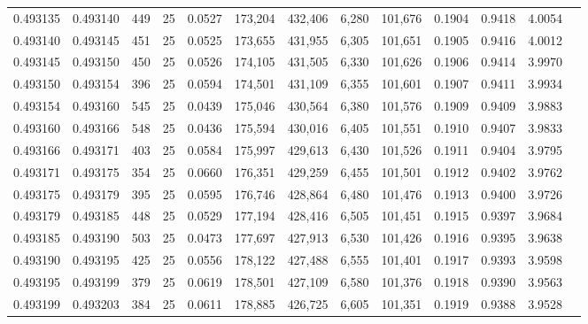 \begin{tabular}{rrrrrrrrrrrrr}
0.493135 & 0.493140 &   449 &  25 &                                     0.0527 & 173,204 & 432,406 &   6,280 & 101,676 & 0.1904 & 0.9418 & 4.0054 \\
0.493140 & 0.493145 &   451 &  25 &                                     0.0525 & 173,655 & 431,955 &   6,305 & 101,651 & 0.1905 & 0.9416 & 4.0012 \\
0.493145 & 0.493150 &   450 &  25 &                                     0.0526 & 174,105 & 431,505 &   6,330 & 101,626 & 0.1906 & 0.9414 & 3.9970 \\
0.493150 & 0.493154 &   396 &  25 &                                     0.0594 & 174,501 & 431,109 &   6,355 & 101,601 & 0.1907 & 0.9411 & 3.9934 \\
0.493154 & 0.493160 &   545 &  25 &                                     0.0439 & 175,046 & 430,564 &   6,380 & 101,576 & 0.1909 & 0.9409 & 3.9883 \\
0.493160 & 0.493166 &   548 &  25 &                                     0.0436 & 175,594 & 430,016 &   6,405 & 101,551 & 0.1910 & 0.9407 & 3.9833 \\
0.493166 & 0.493171 &   403 &  25 &                                     0.0584 & 175,997 & 429,613 &   6,430 & 101,526 & 0.1911 & 0.9404 & 3.9795 \\
0.493171 & 0.493175 &   354 &  25 &                                     0.0660 & 176,351 & 429,259 &   6,455 & 101,501 & 0.1912 & 0.9402 & 3.9762 \\
0.493175 & 0.493179 &   395 &  25 &                                     0.0595 & 176,746 & 428,864 &   6,480 & 101,476 & 0.1913 & 0.9400 & 3.9726 \\
0.493179 & 0.493185 &   448 &  25 &                                     0.0529 & 177,194 & 428,416 &   6,505 & 101,451 & 0.1915 & 0.9397 & 3.9684 \\
0.493185 & 0.493190 &   503 &  25 &                                     0.0473 & 177,697 & 427,913 &   6,530 & 101,426 & 0.1916 & 0.9395 & 3.9638 \\
0.493190 & 0.493195 &   425 &  25 &                                     0.0556 & 178,122 & 427,488 &   6,555 & 101,401 & 0.1917 & 0.9393 & 3.9598 \\
0.493195 & 0.493199 &   379 &  25 &                                     0.0619 & 178,501 & 427,109 &   6,580 & 101,376 & 0.1918 & 0.9390 & 3.9563 \\
0.493199 & 0.493203 &   384 &  25 &                                     0.0611 & 178,885 & 426,725 &   6,605 & 101,351 & 0.1919 & 0.9388 & 3.9528 \\

\end{tabular}
